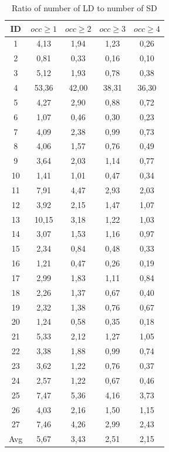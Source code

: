 \documentclass[12pt]{mitthesis}
\begin{document}
\begin{table}[H]
\caption{Ratio of number of LD to number of SD}
\label{table:ld_ratio}
\centering
\begin{tabular}{|c|c|c|c|c|}
\hline
    ID  & $occ\geq 1$ & $occ\geq 2$ & $occ\geq 3$ & $occ\geq 4$  \\
\hline
1	&	4,13	&	1,94	&	1,23	&	0,26	\\
2	&	0,81	&	0,33	&	0,16	&	0,10	\\
3	&	5,12	&	1,93	&	0,78	&	0,38	\\
4	&	53,36	&	42,00	&	38,31	&	36,30	\\
5	&	4,27	&	2,90	&	0,88	&	0,72	\\
6	&	1,07	&	0,46	&	0,30	&	0,23	\\
7	&	4,09	&	2,38	&	0,99	&	0,73	\\
8	&	4,06	&	1,57	&	0,76	&	0,49	\\
9	&	3,64	&	2,03	&	1,14	&	0,77	\\
10	&	1,41	&	1,01	&	0,47	&	0,34	\\
11	&	7,91	&	4,47	&	2,93	&	2,03	\\
12	&	3,92	&	2,15	&	1,47	&	1,07	\\
13	&	10,15	&	3,18	&	1,22	&	1,03	\\
14	&	3,07	&	1,53	&	1,16	&	0,97	\\
15	&	2,34	&	0,84	&	0,48	&	0,33	\\
16	&	1,21	&	0,47	&	0,26	&	0,19	\\
17	&	2,99	&	1,83	&	1,11	&	0,84	\\
18	&	2,26	&	1,37	&	0,67	&	0,40	\\
19	&	2,32	&	1,38	&	0,76	&	0,67	\\
20	&	1,24	&	0,58	&	0,35	&	0,18	\\
21	&	5,33	&	2,12	&	1,27	&	1,05	\\
22	&	3,38	&	1,88	&	0,99	&	0,74	\\
23	&	3,62	&	1,22	&	0,76	&	0,37	\\
24	&	2,57	&	1,22	&	0,67	&	0,46	\\
25	&	7,47	&	5,36	&	4,16	&	3,73	\\
26	&	4,03	&	2,16	&	1,50	&	1,15	\\
27	&	7,46	&	4,26	&	2,99	&	2,43	\\
\hline
Avg	&	5,67	&	3,43	&	2,51	&	2,15	\\
\hline
\end{tabular}
\end{table}
\end{document}
